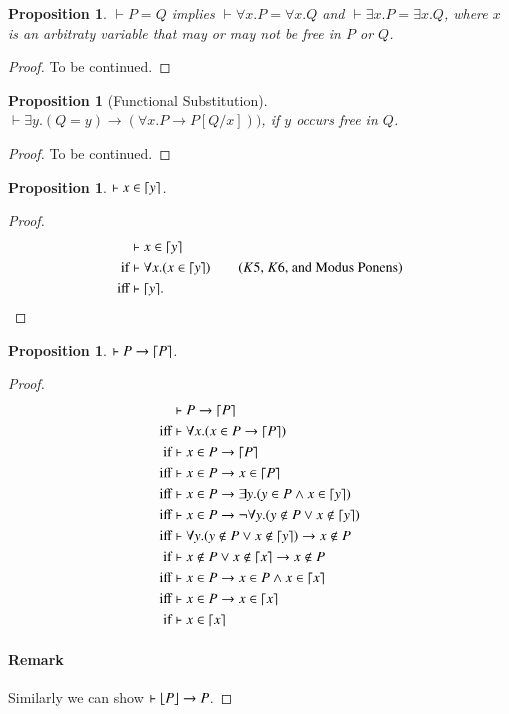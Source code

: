 \documentclass{article}
\theoremstyle{plain}
\newtheorem{prop}[thm]{Proposition}
\DeclarePairedDelimiter\ceil{\lceil}{\rceil}
\DeclarePairedDelimiter\floor{\lfloor}{\rfloor}
\begin{document}
\begin{prop}
	$\vdash P=Q$ implies $\vdash \forall x . P = \forall x . Q$ and $\vdash \exists x . P = \exists x . Q$, where $x$ is an arbitraty variable that may or may not be free in $P$ or $Q$.
\end{prop}
\begin{proof}
	To be continued.
\end{proof}


\begin{prop}[Functional Substitution]
$\vdash \exists y . (Q = y) \to (\forall x . P \to P[Q/x]))$, if $y$ occurs free in $Q$.
\end{prop}

\begin{proof}
	To be continued.
\end{proof}


\begin{prop} \label{prop:var1}
$\vdash x \in \ceil*{y}$.
\end{prop}
\begin{proof}
\begin{align*}
&\vdash x \in \ceil*{y} \\
{\text{if}}& \vdash \forall x . (x \in \ceil*{y}) \tag{$K5$, $K6$, and Modus Ponens} \\
{\text{iff}}& \vdash \ceil*{y}.
\end{align*}
\end{proof}

\begin{prop} \label{prop:p->ceilp}
$\vdash P \to \ceil*{P}$.
\end{prop}
\begin{proof}
\begin{align*} 
&\vdash P \to \ceil*{P} \\
{\text{iff}}& \vdash \forall x . (x \in P \to \ceil*{P}) \\
{\text{if}}&  \vdash x \in P \to \ceil*{P} \\
{\text{iff}}& \vdash x \in P \to x \in \ceil*{P} \\
{\text{iff}}& \vdash x \in P \to \exists y . (y \in P \wedge x \in \ceil*{y}) \\
{\text{iff}}& \vdash x \in P \to \neg \forall y . (y \not \in P \vee x \not \in \ceil*{y}) \\
{\text{iff}}& \vdash \forall y . (y \not \in P \vee x \not \in \ceil*{y}) \to x \not \in P \\
{\text{if}}&  \vdash x \not \in P \vee x \not \in \ceil*{x} \to x \not \in P \\
{\text{iff}}& \vdash x \in P \to x \in P \wedge x \in \ceil*{x} \\
{\text{iff}}& \vdash x \in P \to x \in \ceil*{x} \\
{\text{if}}&  \vdash x \in \ceil*{x} \\
\end{align*}
\paragraph{Remark} Similarly we can show $\vdash \floor*{P} \to P$.
\end{proof}
\end{document}
